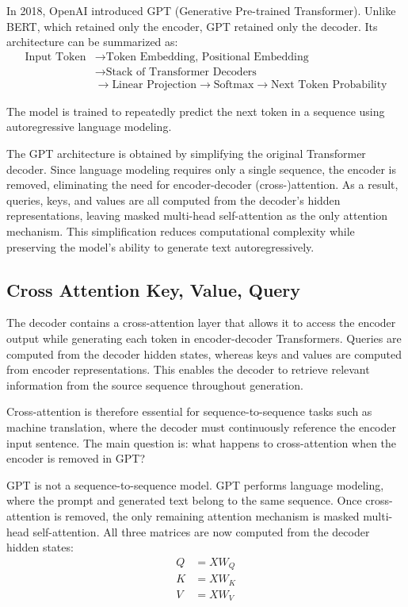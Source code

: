 In 2018, OpenAI introduced GPT (Generative Pre-trained Transformer). Unlike BERT, which retained only the encoder, GPT retained only the decoder. Its architecture can be summarized as:
\begin{align*}
\text{Input Token} &\longrightarrow \text{Token Embedding, Positional Embedding} \\
&\longrightarrow \text{Stack of Transformer Decoders} \\
&\longrightarrow \text{Linear Projection} \longrightarrow \text{Softmax} \longrightarrow \text{Next Token Probability}
\end{align*}

The model is trained to repeatedly predict the next token in a sequence using autoregressive language modeling.

The GPT architecture is obtained by simplifying the original Transformer decoder. Since language modeling requires only a single sequence, the encoder is removed, eliminating the need for encoder-decoder (cross-)attention. As a result, queries, keys, and values are all computed from the decoder's hidden representations, leaving masked multi-head self-attention as the only attention mechanism. This simplification reduces computational complexity while preserving the model's ability to generate text autoregressively.

\subsection{Cross Attention Key, Value, Query}

The decoder contains a cross-attention layer that allows it to access the encoder output while generating each token in encoder-decoder Transformers. Queries are computed from the decoder hidden states, whereas keys and values are computed from encoder representations. This enables the decoder to retrieve relevant information from the source sequence throughout generation.

Cross-attention is therefore essential for sequence-to-sequence tasks such as machine translation, where the decoder must continuously reference the encoder input sentence. The main question is: what happens to cross-attention when the encoder is removed in GPT?

GPT is not a sequence-to-sequence model. GPT performs language modeling, where the prompt and generated text belong to the same sequence. Once cross-attention is removed, the only remaining attention mechanism is masked multi-head self-attention. All three matrices are now computed from the decoder hidden states:
\begin{align*}
Q &= X W_Q \\
K &= X W_K \\
V &= X W_V
\end{align*}

